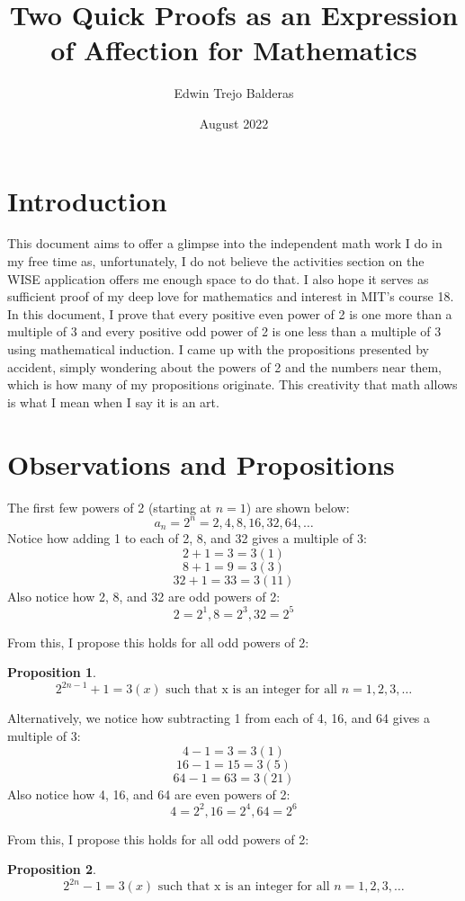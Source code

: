 \documentclass[12pt, letterpaper]{article}
\title{Two Quick Proofs as an Expression of Affection for Mathematics}
\author{Edwin Trejo Balderas}
\date{August 2022}
\newcommand{\forceindent}{\leavevmode{\parindent=1em\indent}}
\theoremstyle{definition}
\theoremstyle{definition}
\theoremstyle{definition}
\newtheorem{prop}{Proposition}
\begin{document}
\maketitle

\section{Introduction}
\forceindent This document aims to offer a glimpse into the independent math work I do in my free time as, unfortunately, I do not believe the activities section on the WISE application offers me enough space to do that. 
I also hope it serves as sufficient proof of my deep love for mathematics and interest in MIT's course 18.
In this document, I prove that every positive even power of 2 is one more than a multiple of 3 and every positive odd power of 2 is one less than a multiple of 3 using mathematical induction. 
I came up with the propositions presented by accident, simply wondering about the powers of 2 and the numbers near them, which is how many of my propositions originate. This creativity that math allows is what I mean when I say it is an art. 

\section{Observations and Propositions}
\forceindent The first few powers of 2 (starting at \(n=1\)) are shown below:
\[a_n = 2^n = 2,4,8,16,32,64,\dots\]
Notice how adding 1 to each of 2, 8, and 32 gives a multiple of 3:
\[2 + 1 = 3 = 3(1)\]
\[8 + 1 = 9 = 3(3)\]
\[32 + 1 = 33 = 3(11)\]
Also notice how 2, 8, and 32 are odd powers of 2:
\[2 = 2^1, 8=2^3, 32=2^5\]

From this, I propose this holds for all odd powers of 2:

\begin{prop}
    \[2^{2n-1} + 1 = 3(x) \mbox{ such that x is an integer for all } n = 1,2,3,\dots\]
\end{prop}

Alternatively, we notice how subtracting 1 from each of 4, 16, and 64 gives a multiple of 3:
\[4 - 1 = 3 = 3(1)\]
\[16 - 1 = 15 = 3(5)\]
\[64 - 1 = 63 = 3(21)\]
Also notice how 4, 16, and 64 are even powers of 2:
\[4 = 2^2, 16=2^4, 64=2^6\]

From this, I propose this holds for all odd powers of 2:

\begin{prop}
    \[2^{2n} - 1 = 3(x) \mbox{ such that x is an integer for all } n = 1,2,3,\dots\]
\end{prop}
\end{document}
